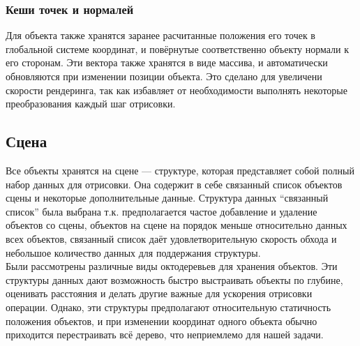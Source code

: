 \documentclass[a4paper,12pt]{report}
\begin{document}
\subsubsection{Кеши точек и нормалей}
Для объекта также хранятся заранее расчитанные положения его точек в глобальной системе координат, и повёрнутые соответственно объекту нормали к его сторонам. Эти вектора также хранятся в виде массива, и автоматически обновляются при изменении позиции объекта. Это сделано для увеличени скорости рендеринга, так как избавляет от необходимости выполнять некоторые преобразования каждый шаг отрисовки.

\subsection{Сцена}
Все объекты хранятся на сцене --- структуре, которая представляет собой полный набор данных для отрисовки. Она содержит в себе связанный список объектов сцены и некоторые дополнительные данные. Структура данных ``связанный список'' была выбрана т.к. предполагается частое добавление и удаление объектов со сцены, объектов на сцене на порядок меньше относительно данных всех объектов, связанный список даёт удовлетворительную скорость обхода и небольшое количество данных для поддержания структуры. \\
Были рассмотрены различные виды октодеревьев для хранения объектов. Эти структуры данных дают возможность быстро выстраивать объекты по глубине, оценивать расстояния и делать другие важные для ускорения отрисовки операции. Однако, эти структуры предполагают относительную статичность положения объектов, и при изменении координат одного объекта обычно приходится перестраивать всё дерево, что неприемлемо для нашей задачи.
\end{document}
